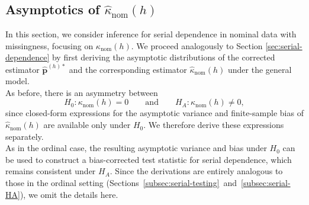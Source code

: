 ﻿\documentclass[12pt,a4paper]{scrreprt}
\theoremstyle{definition}
\begin{document}
\begin{appendices}
\section{Asymptotics of $\hat{\kappa}_{\mathrm{nom}}(h)$}\label{app:nominal-serial}
In this section, we consider inference for serial dependence in nominal data with missingness, focusing on $\kappa_{\mathrm{nom}}(h)$. We proceed analogously to Section \ref{sec:serial-dependence} by first deriving the asymptotic distributions of the corrected estimator $\hat{\boldsymbol{p}}^{(h)*}$ and the corresponding estimator $\hat{\kappa}_{\mathrm{nom}}(h)$ under the general model.\\
As before, there is an asymmetry between
\[
H_0: \kappa_{\mathrm{nom}}(h)=0
\qquad\text{and}\qquad
H_A: \kappa_{\mathrm{nom}}(h)\neq 0,
\]
since closed-form expressions for the asymptotic variance and finite-sample bias of $\hat{\kappa}_{\mathrm{nom}}(h)$ are available only under $H_0$. We therefore derive these expressions separately.\\
As in the ordinal case, the resulting asymptotic variance and bias under $H_0$ can be used to construct a bias-corrected test statistic for serial dependence, which remains consistent under $H_A$.
Since the derivations are entirely analogous to those in the ordinal setting (Sections~\ref{subsec:serial-testing}~and~\ref{subsec:serial-HA}), we omit the details here.


\end{appendices}
\end{document}
